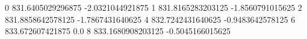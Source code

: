 0 831.6405029296875 -2.0321044921875
1 831.8165283203125 -1.8560791015625
2 831.8858642578125 -1.7867431640625
4 832.7242431640625 -0.9483642578125
6 833.672607421875 0.0
8 833.1680908203125 -0.5045166015625
